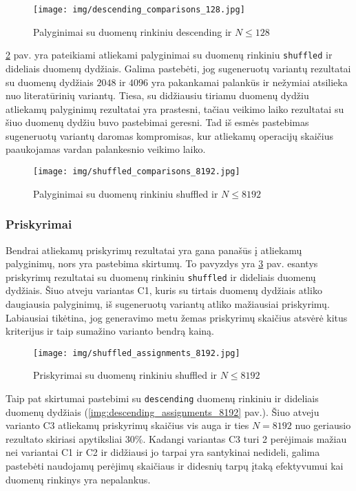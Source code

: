 \documentclass{VUMIFInfBakalaurinis}
\begin{document}
\begin{figure}[H]
  \centering
  \texttt{[image: img/descending\_comparisons\_128.jpg]}
  \caption{Palyginimai su duomenų rinkiniu descending ir $N \leq 128$}
  \label{img:descending_comparisons_128}
\end{figure}

\ref{img:shuffled_comparisons_8192} pav. yra pateikiami atliekami palyginimai su duomenų rinkiniu \verb|shuffled| ir dideliais duomenų dydžiais.
Galima pastebėti, jog sugeneruotų variantų rezultatai su duomenų dydžiais $2048$ ir $4096$ yra pakankamai palankūs ir nežymiai atsilieka nuo literatūrinių variantų.
Tiesa, su didžiausiu tiriamu duomenų dydžiu atliekamų palyginimų rezultatai yra prastesni, tačiau veikimo laiko rezultatai su šiuo duomenų dydžiu buvo pastebimai geresni.
Tad iš esmės pastebimas sugeneruotų variantų daromas kompromisas, kur atliekamų operacijų skaičius paaukojamas vardan palankesnio veikimo laiko.

\begin{figure}[H]
  \centering
  \texttt{[image: img/shuffled\_comparisons\_8192.jpg]}
  \caption{Palyginimai su duomenų rinkiniu shuffled ir $N \leq 8192$}
  \label{img:shuffled_comparisons_8192}
\end{figure}

\pagebreak

\subsubsection{Priskyrimai}

Bendrai atliekamų priskyrimų rezultatai yra gana panašūs į atliekamų palyginimų, nors yra pastebima skirtumų.
To pavyzdys yra \ref{img:shuffled_assignments_8192} pav. esantys priskyrimų rezultatai su duomenų rinkiniu \verb|shuffled| ir dideliais duomenų dydžiais.
Šiuo atveju variantas C1, kuris su tirtais duomenų dydžiais atliko daugiausia palyginimų, iš sugeneruotų variantų atliko mažiausiai priskyrimų.
Labiausiai tikėtina, jog generavimo metu žemas priskyrimų skaičius atsvėrė kitus kriterijus ir taip sumažino varianto bendrą kainą.    

\begin{figure}[H]
  \centering
  \texttt{[image: img/shuffled\_assignments\_8192.jpg]}
  \caption{Priskyrimai su duomenų rinkiniu shuffled ir $N \leq 8192$}
  \label{img:shuffled_assignments_8192}
\end{figure}

Taip pat skirtumai pastebimi su \verb|descending| duomenų rinkiniu ir dideliais duomenų dydžiais (\ref{img:descending_assignments_8192} pav.).
Šiuo atveju varianto C3 atliekamų priskyrimų skaičius vis auga ir ties $N = 8192$ nuo geriausio rezultato skiriasi apytiksliai 30\%.
Kadangi variantas C3 turi 2 perėjimais mažiau nei variantai C1 ir C2 ir didžiausi jo tarpai yra santykinai nedideli,
galima pastebėti naudojamų perėjimų skaičiaus ir didesnių tarpų įtaką efektyvumui kai duomenų rinkinys yra nepalankus.
\end{document}
